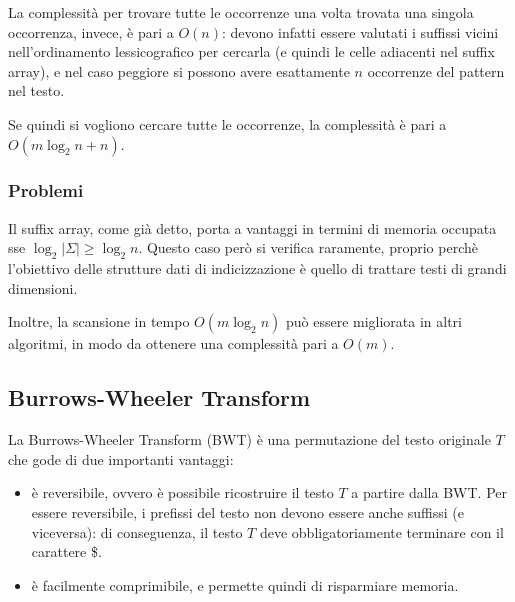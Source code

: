 La complessità per trovare tutte le occorrenze una volta trovata una singola occorrenza, invece, è pari a $O(n)$: devono infatti essere valutati i suffissi vicini nell'ordinamento lessicografico per cercarla (e quindi le celle adiacenti nel suffix array), e nel caso peggiore si possono avere esattamente $n$ occorrenze del pattern nel testo.

Se quindi si vogliono cercare tutte le occorrenze, la complessità è pari a $O(m \log_2 n + n)$.

\subsubsection{Problemi}
Il suffix array, come già detto, porta a vantaggi in termini di memoria occupata sse $\log_2 |\Sigma| \ge \log_2 n$. Questo caso però si verifica raramente, proprio perchè l'obiettivo delle strutture dati di indicizzazione è quello di trattare testi di grandi dimensioni.

Inoltre, la scansione in tempo $O(m \log_2 n)$ può essere migliorata in altri algoritmi, in modo da ottenere una complessità pari a $O(m)$.

\subsection*{Burrows-Wheeler Transform}
\begin{defn}
    La Burrows-Wheeler Transform (BWT) è una permutazione del testo originale $T$ che gode di due importanti vantaggi:
    \begin{itemize}
        \item è reversibile, ovvero è possibile ricostruire il testo $T$ a partire dalla BWT. Per essere reversibile, i prefissi del testo non devono essere anche suffissi (e viceversa): di conseguenza, il testo $T$ deve obbligatoriamente terminare con il carattere \$.
        \item è facilmente comprimibile, e permette quindi di risparmiare memoria.
    \end{itemize}
\end{defn}

